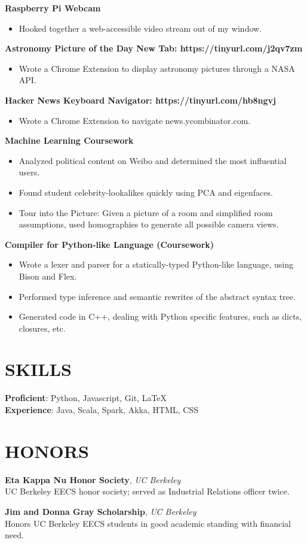 \documentclass[line,margin]{res}
\begin{document}
\begin{resume}
{\bf Raspberry Pi Webcam}
\begin{itemize} \itemsep - 1pt
  \item Hooked together a web-accessible video stream out of my window.
\end{itemize}

{\bf Astronomy Picture of the Day New Tab: https://tinyurl.com/j2qv7zm}
\begin{itemize} \itemsep - 1pt
  \item Wrote a Chrome Extension to display astronomy pictures through a NASA API.
\end{itemize}

{\bf Hacker News Keyboard Navigator: https://tinyurl.com/hb8ngvj}
\begin{itemize} \itemsep - 1pt
  \item Wrote a Chrome Extension to navigate news.ycombinator.com.
\end{itemize}


{\bf Machine Learning Coursework}
\begin{itemize} \itemsep - 1pt
  \item Analyzed political content on Weibo and determined the most influential users.
  \item Found student celebrity-lookalikes quickly using PCA and eigenfaces.
  \item Tour into the Picture: Given a picture of a room and simplified room assumptions,
      used homographies to generate all possible camera views.
\end{itemize}

{\bf Compiler for Python-like Language (Coursework)}
\begin{itemize} \itemsep - 1pt
  \item Wrote a lexer and parser for a statically-typed Python-like language,
      using Bison and Flex.
  \item Performed type inference and semantic rewrites of the abstract
      syntax tree.
  \item Generated code in C++, dealing with Python specific features, such as
      dicts, closures, etc.
\end{itemize}


\section{SKILLS}
{\bf Proficient}: Python, Javascript, Git, \LaTeX \\
{\bf Experience}: Java, Scala, Spark, Akka, HTML, CSS\\


\section{HONORS}
{\bf Eta Kappa Nu Honor Society}, {\it UC Berkeley}\\
UC Berkeley EECS honor society; served as Industrial Relations officer twice.

{\bf Jim and Donna Gray Scholarship}, {\it UC Berkeley}\\
Honors UC Berkeley EECS students in good academic standing with financial need.

\end{resume}
\end{document}
